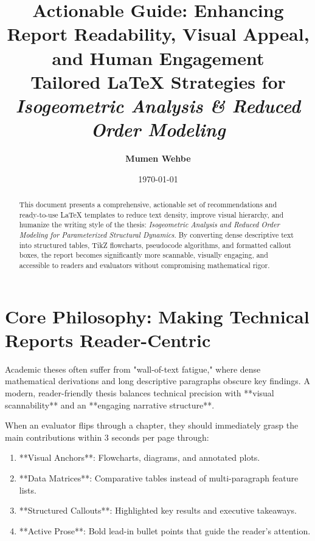 \documentclass[12pt,a4paper]{article}
\title{
    \vspace{-1cm}
    \textbf{\Large Actionable Guide: Enhancing Report Readability, Visual Appeal, and Human Engagement}\\[0.4em]
    \large Tailored LaTeX Strategies for \textit{Isogeometric Analysis \& Reduced Order Modeling}
}
\author{\textbf{Mumen Wehbe}}
\date{\today}
\begin{document}
\maketitle

\begin{abstract}
\noindent This document presents a comprehensive, actionable set of recommendations and ready-to-use LaTeX templates to reduce text density, improve visual hierarchy, and humanize the writing style of the thesis: \textit{Isogeometric Analysis and Reduced Order Modeling for Parameterized Structural Dynamics}. By converting dense descriptive text into structured tables, TikZ flowcharts, pseudocode algorithms, and formatted callout boxes, the report becomes significantly more scannable, visually engaging, and accessible to readers and evaluators without compromising mathematical rigor.
\end{abstract}

\tableofcontents
\newpage

\section{Core Philosophy: Making Technical Reports Reader-Centric}

Academic theses often suffer from "wall-of-text fatigue," where dense mathematical derivations and long descriptive paragraphs obscure key findings. A modern, reader-friendly thesis balances technical precision with **visual scannability** and an **engaging narrative structure**.

\begin{tcolorbox}[colback=lightbg, colframe=primaryblue, title=\textbf{The 3-Second Scanning Rule for Evaluators}, fonttitle=\bfseries]
When an evaluator flips through a chapter, they should immediately grasp the main contributions within 3 seconds per page through:
\begin{enumerate}[leftmargin=*]
    \item **Visual Anchors**: Flowcharts, diagrams, and annotated plots.
    \item **Data Matrices**: Comparative tables instead of multi-paragraph feature lists.
    \item **Structured Callouts**: Highlighted key results and executive takeaways.
    \item **Active Prose**: Bold lead-in bullet points that guide the reader's attention.
\end{enumerate}
\end{tcolorbox}
\end{document}
